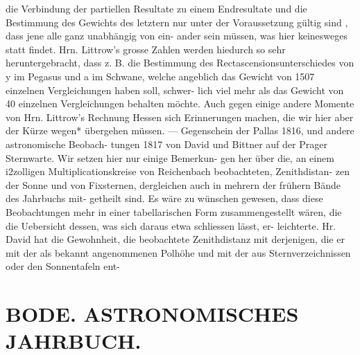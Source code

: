 \documentclass[12pt,a4paper]{article}
\begin{document}
{{{{{{{{die  Verbindung  der  partiellen  Resultate  zu  einem  Endresultate  und  die  Bestimmung  des Gewichts  des  letztern  nur  unter  der  Voraussetzung  gültig  sind ,  dass  jene  alle  ganz  unabhängig  von  ein- ander sein  müssen,  was  hier  keinesweges  statt  findet.  Hrn.  Littrow's  grosse  Zahlen  werden  hiedurch so  sehr  heruntergebracht,  dass  z.  B.  die  Bestimmung  des  Rectascensionsunterschiedes  von  y  im  Pegasus und  a  im  Schwane,  welche  angeblich  das  Gewicht  von  1507  einzelnen  Vergleichungen  haben  soll,  schwer- lich viel  mehr  als  das  Gewicht  von  40  einzelnen  Vergleichungen  behalten  möchte.  Auch  gegen  einige andere  Momente  von  Hrn.  Littrow's  Rechnung  Hessen  sich  Erinnerungen  machen,  die  wir  hier  aber  der Kürze  wegen* übergehen  müssen.  ---  Gegenschein  der  Pallas  1816,  und  andere  astronomische  Beobach- tungen 1817  von  David  und  Bittner  auf  der  Prager  Sternwarte.  Wir  setzen  hier  nur  einige  Bemerkun- gen her  über  die,  an  einem  i2zolligen  Multiplicationskreise  von  Reichenbach  beobachteten,  Zenithdistan- zen  der  Sonne  und  von  Fixsternen,  dergleichen  auch  in  mehrern  der  frühern  Bände  des  Jahrbuchs  mit- getheilt  sind.  Es  wäre  zu  wünschen  gewesen,  dass  diese  Beobachtungen  mehr  in  einer  tabellarischen Form  zusammengestellt  wären,  die  die  Uebersicht  dessen,  was  sich  daraus  etwa  schliessen  lässt,  er- leichterte. Hr.  David  hat  die  Gewohnheit,  die  beobachtete  Zenithdistanz  mit  derjenigen,  die  er  mit  der als  bekannt  angenommenen  Polhöhe    und   mit   der   aus  Sternverzeichnissen  oder  den  Sonnentafeln  ent-


\section*{BODE.     ASTRONOMISCHES  JAHRBUCH.}

}}}}}}}}
\end{document}
